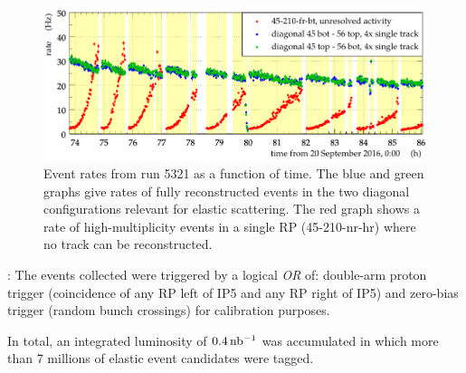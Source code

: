 \begin{figure}
\begin{center}
\includegraphics{fig/rates_vs_time.pdf}
\caption{%
Event rates from run 5321 as a function of time. The blue and green graphs give rates of fully reconstructed events in the two diagonal configurations relevant for elastic scattering. The red graph shows a rate of high-multiplicity events in a single RP (45-210-nr-hr) where no track can be reconstructed.
}
\label{fig:rates_vs_time}
\end{center}
\end{figure}

:
The events collected were triggered by a logical \textit{OR} of: double-arm proton trigger 
(coincidence of any RP left of IP5 and any RP right of IP5) and zero-bias trigger (random bunch crossings) for calibration purposes.

In total, an integrated luminosity of $0.4\,\rm nb^{-1}$ was accumulated in which more than 7 millions of elastic event candidates were tagged.
